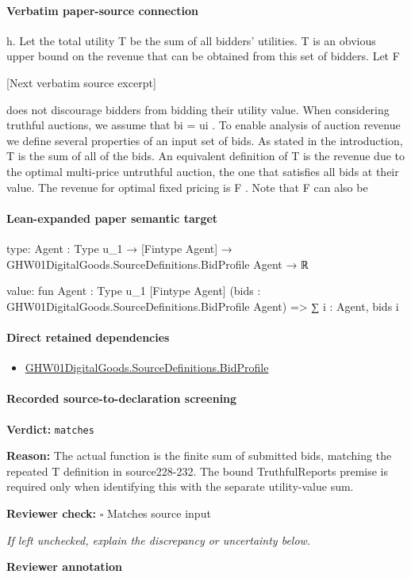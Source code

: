 \documentclass[10pt]{article}
\newcommand{\reviewerbox}{%
  \par\noindent\fbox{\parbox{0.96\linewidth}{\rule{0pt}{0.38in}}}\par
}
\newcommand{\reviewmatch}[1]{%
  \par\noindent\textbf{Reviewer check:} $\square$\; #1\par
  \noindent\emph{If left unchecked, explain the discrepancy or uncertainty below.}\par
}
\begin{document}
\paragraph{Verbatim paper-source connection}
\begin{ReviewVerbatim}
h. Let the total utility T be the sum of all bidders’
utilities. T is an obvious upper bound on the revenue
that can be obtained from this set of bidders. Let F

[Next verbatim source excerpt]

does not discourage bidders from bidding their utility value. When considering truthful auctions, we
assume that bi = ui .
To enable analysis of auction revenue we define several properties of an input set of bids. As stated in
the introduction, T is the sum of all of the bids. An
equivalent definition of T is the revenue due to the
optimal multi-price untruthful auction, the one that
satisfies all bids at their value. The revenue for optimal fixed pricing is F . Note that F can also be
\end{ReviewVerbatim}



\paragraph{Lean-expanded paper semantic target}
\begin{ReviewVerbatim}
type:
{Agent : Type u_1} → [Fintype Agent] → GHW01DigitalGoods.SourceDefinitions.BidProfile Agent → ℝ

value:
fun {Agent : Type u_1} [Fintype Agent] (bids : GHW01DigitalGoods.SourceDefinitions.BidProfile Agent) =>
  ∑ i : Agent, bids i
\end{ReviewVerbatim}

\paragraph{Direct retained dependencies}
\begin{itemize}\raggedright
\item \hyperlink{paper-prerequisite-ac8769d0dccf04f4}{GHW01\allowbreak{}Digital\allowbreak{}Goods.\allowbreak{}Source\allowbreak{}Definitions.\allowbreak{}Bid\allowbreak{}Profile}
\end{itemize}
\paragraph{Recorded source-to-declaration screening}
\textbf{Verdict:} \texttt{matches}
\\
{\raggedright
\textbf{Reason:} The actual function is the finite sum of submitted bids, matching the repeated T definition in source228-\allowbreak{}232.\allowbreak{} The bound TruthfulReports premise is required only when identifying this with the separate utility-\allowbreak{}value sum.\allowbreak{}
\par}
\reviewmatch{Matches source input}
\noindent\textbf{Reviewer annotation}\par
\reviewerbox
\clearpage
\hypertarget{paper-prerequisite-7e98fae0fda55be2}{}
\end{document}
